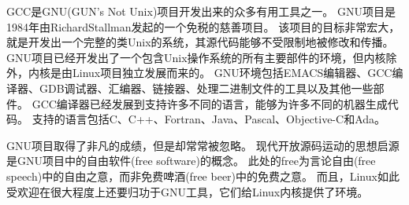 {    \begin{sidenote}[GNU项目]
        GCC是GNU(GUN's Not Unix)项目开发出来的众多有用工具之一。
        GNU项目是1984年由RichardStallman发起的一个免税的慈善项目。
        该项目的目标非常宏大，就是开发出一个完整的类Unix的系统，其源代码能够不受限制地被修改和传播。
        GNU项目已经开发出了一个包含Unix操作系统的所有主要部件的环境，但内核除外，内核是由Linux项目独立发展而来的。
        GNU环境包括EMACS编辑器、GCC编译器、GDB调试器、汇编器、链接器、处理二进制文件的工具以及其他一些部件。
        GCC编译器已经发展到支持许多不同的语言，能够为许多不同的机器生成代码。
        支持的语言包括C、C++、Fortran、Java、Pascal、Objective-C和Ada。

        GNU项目取得了非凡的成绩，但是却常常被忽略。
        现代开放源码运动的思想启源是GNU项目中的自由软件(free software)的概念。
        此处的free为言论自由(free speech)中的自由之意，而非免费啤酒(free beer)中的免费之意。
        而且，Linux如此受欢迎在很大程度上还要归功于GNU工具，它们给Linux内核提供了环境。
    \end{sidenote}
}

\endinput
